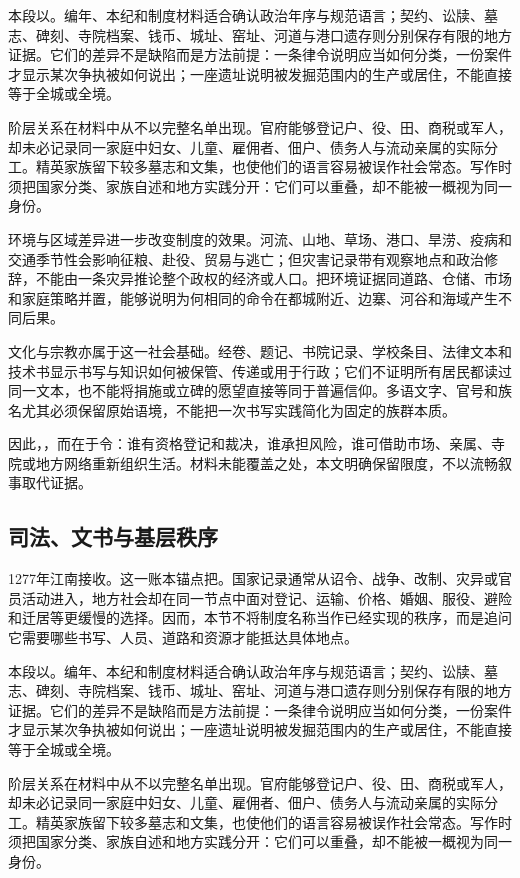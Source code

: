 本段以。编年、本纪和制度材料适合确认政治年序与规范语言；契约、讼牍、墓志、碑刻、寺院档案、钱币、城址、窑址、河道与港口遗存则分别保存有限的地方证据。它们的差异不是缺陷而是方法前提：一条律令说明应当如何分类，一份案件才显示某次争执被如何说出；一座遗址说明被发掘范围内的生产或居住，不能直接等于全城或全境。

阶层关系在材料中从不以完整名单出现。官府能够登记户、役、田、商税或军人，却未必记录同一家庭中妇女、儿童、雇佣者、佃户、债务人与流动亲属的实际分工。精英家族留下较多墓志和文集，也使他们的语言容易被误作社会常态。写作时须把国家分类、家族自述和地方实践分开：它们可以重叠，却不能被一概视为同一身份。

环境与区域差异进一步改变制度的效果。河流、山地、草场、港口、旱涝、疫病和交通季节性会影响征粮、赴役、贸易与逃亡；但灾害记录带有观察地点和政治修辞，不能由一条灾异推论整个政权的经济或人口。把环境证据同道路、仓储、市场和家庭策略并置，能够说明为何相同的命令在都城附近、边寨、河谷和海域产生不同后果。

文化与宗教亦属于这一社会基础。经卷、题记、书院记录、学校条目、法律文本和技术书显示书写与知识如何被保管、传递或用于行政；它们不证明所有居民都读过同一文本，也不能将捐施或立碑的愿望直接等同于普遍信仰。多语文字、官号和族名尤其必须保留原始语境，不能把一次书写实践简化为固定的族群本质。

因此，，而在于令：谁有资格登记和裁决，谁承担风险，谁可借助市场、亲属、寺院或地方网络重新组织生活。材料未能覆盖之处，本文明确保留限度，不以流畅叙事取代证据。

\subsection{司法、文书与基层秩序}

1277年江南接收。这一账本锚点把。国家记录通常从诏令、战争、改制、灾异或官员活动进入，地方社会却在同一节点中面对登记、运输、价格、婚姻、服役、避险和迁居等更缓慢的选择。因而，本节不将制度名称当作已经实现的秩序，而是追问它需要哪些书写、人员、道路和资源才能抵达具体地点。

本段以。编年、本纪和制度材料适合确认政治年序与规范语言；契约、讼牍、墓志、碑刻、寺院档案、钱币、城址、窑址、河道与港口遗存则分别保存有限的地方证据。它们的差异不是缺陷而是方法前提：一条律令说明应当如何分类，一份案件才显示某次争执被如何说出；一座遗址说明被发掘范围内的生产或居住，不能直接等于全城或全境。

阶层关系在材料中从不以完整名单出现。官府能够登记户、役、田、商税或军人，却未必记录同一家庭中妇女、儿童、雇佣者、佃户、债务人与流动亲属的实际分工。精英家族留下较多墓志和文集，也使他们的语言容易被误作社会常态。写作时须把国家分类、家族自述和地方实践分开：它们可以重叠，却不能被一概视为同一身份。

